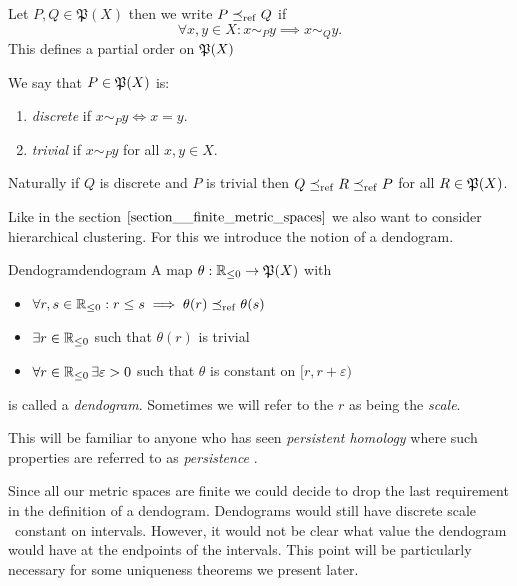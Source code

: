 \begin{definition}{}{}
Let $P, Q \in \mathfrak{P}(X)$ then we write $P \refines Q$ if
\begin{equation*}
    \forall x,y \in X: x \sim_P y \implies x \sim_Q y.
\end{equation*}
This defines a partial order on $\P(X)$
\end{definition}

\begin{definition}{}{}
We say that $P \in \P(X)$ is:
\begin{enumerate}
    \item \emph{discrete} if $x \sim_P y \iff x = y$.
    \item \emph{trivial} if $x \sim_P y$ for all $x,y \in X$.
\end{enumerate}
\end{definition}

Naturally if $Q$ is discrete and $P$ is trivial then $Q \refines R \refines P$ for all $R \in \P(X)$.

Like in the section $\ref{section__finite_metric_spaces}$ we also want to consider hierarchical clustering.
For this we introduce the notion of a dendogram.

\begin{definition}{Dendogram}{dendogram}
A map $\theta: \R_{\leq0} \to \mathfrak{P}(X)$ with
\begin{itemize}
    \item $\forall r,s \in \R_{\leq0}: r \leq s \implies  \theta(r) \refines \theta(s)$
    \item $\exists r \in \R_{\leq0}$ such that $\theta(r)$ is trivial
    \item $\forall r \in \R_{\leq0} \,\exists \varepsilon > 0$ such that $\theta$ is constant on $[r, r + \varepsilon)$
\end{itemize}
is called a \emph{dendogram}. Sometimes we will refer to the $r$ as being the \emph{scale}.
\end{definition}

This will be familiar to anyone who has seen \emph{persistent homology} where such properties are referred to as \emph{persistence} \cite{Carlsson2014}. 

\begin{myremark}{}{}
Since all our metric spaces are finite we could decide to drop the last requirement in the definition of a dendogram. Dendograms would still have discrete scale \ie\ constant on intervals.
However, it would not be clear what value the dendogram would have at the endpoints of the intervals.
This point will be particularly necessary for some uniqueness theorems we present later.
\end{myremark}

